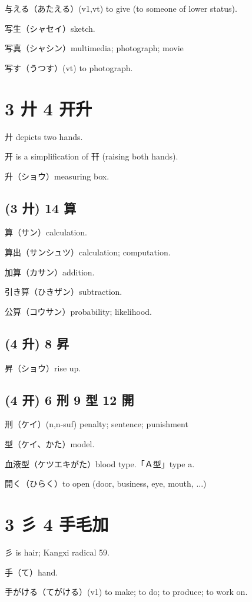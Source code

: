 与える（あたえる）(v1,vt) to give (to someone of lower status).

写生（シャセイ）sketch.

写真（シャシン）multimedia; photograph; movie

写す（うつす）(vt) to photograph.

\section{3 廾 4 开升}

廾 depicts two hands.

开 is a simplification of 幵 (raising both hands).

升（ショウ）measuring box.

\subsection{(3 廾) 14 算}

算（サン）calculation.

算出（サンシュツ）calculation; computation.

加算（カサン）addition.

引き算（ひきザン）subtraction.

公算（コウサン）probability; likelihood.

\subsection{(4 升) 8 昇}

昇（ショウ）rise up.

\subsection{(4 开) 6 刑 9 型 12 開}

刑（ケイ）(n,n-suf) penalty; sentence; punishment

型（ケイ、かた）model.

血液型（ケツエキがた）blood type.「Ａ型」type a.

開く（ひらく）to open (door, business, eye, mouth, ...)

\section{3 彡 4 手毛加}

彡 is hair; Kangxi radical 59.

手（て）hand.

手がける（てがける）(v1) to make; to do; to produce; to work on.

